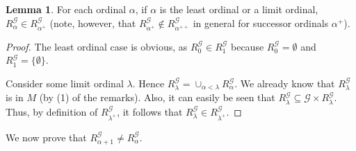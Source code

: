 \documentclass{article}
\theoremstyle{definition}
\newtheorem{lemma}[theorem]{Lemma}
\begin{document}
\begin{lemma}
For each ordinal $\alpha$, if $\alpha$ is the least ordinal or a limit ordinal, 
$R^\mathcal{G}_\alpha\in R^\mathcal{G}_{\alpha^+}$ (note, however, that $R^\mathcal{G}_{\alpha^+}\notin R^\mathcal{G}_{\alpha^{++}}$ in 
general for successor ordinals $\alpha^+$). 
\end{lemma}

\begin{proof}
The least ordinal case is obvious, as $R^\mathcal{G}_0\in R^\mathcal{G}_1$ because 
$R^\mathcal{G}_0=\emptyset$ and $R^\mathcal{G}_1=\{\emptyset\}$.

Consider some limit ordinal $\lambda$. Hence $R^\mathcal{G}_\lambda=\cup_{\alpha<\lambda}R^\mathcal{G}_\alpha$.
We already know that $R^\mathcal{G}_\lambda$ is in $M$ (by (1) of the remarks). Also, it can 
easily be seen that $R^\mathcal{G}_\lambda\subseteq\mathcal{G}\times R^\mathcal{G}_\lambda$. 
Thus, by definition of $R^\mathcal{G}_{\lambda^+}$, it follows that 
$R^\mathcal{G}_\lambda\in R^\mathcal{G}_{\lambda^+}$.
\end{proof}

We now prove that $R^\mathcal{G}_{\alpha+1}\ne R^\mathcal{G}_\alpha$.
\end{document}
